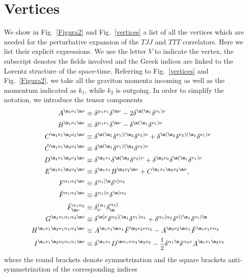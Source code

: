 \documentclass[a4paper,11pt,openright,twoside]{book}
\let\a=\alpha   \let\b=\beta   \let\g=\gamma   \let\d=\delta
\let\n=\nu      \let\x=\xi     \let\p=\pi      \let\r=\rho
\newcommand{\sdfrac}[2]{\mbox{\small$\displaystyle\frac{#1}{#2}$}}
\newcommand{\figref}[1]{Fig.~\ref{#1}}			%
\numberwithin{equation}{section}
\begin{document}
{{\chapter{Vertices}\label{Appendix1}
We show in \figref{Figura2} and \figref{vertices} a list of all the vertices which are needed for the  perturbative expansion of the $TJJ$ and $TTT$ correlators. Here we list their explicit expressions. We use the letter $V$ to indicate the vertex, the subscript denotes the fields involved and the Greek indices are linked to the Lorentz structure of the space-time. Referring to \figref{vertices} and \figref{Figura2}, we take all the graviton momenta incoming as well as the momentum indicated as $k_1$, while $k_2$ is outgoing. In order to simplify the notation, we introduce the tensor components
\begin{align}
	A^{\m_1\n_1\m\n}&\equiv\d^{\mu_1\nu_1}\d^{\m\n}-2\d^{\m(\m_1}\d^{\n_1)\n}\\
	B^{\m_1\n_1\m\n}&\equiv\d^{\mu_1\nu_1}\d^{\m\n}-\d^{\m(\m_1}\d^{\n_1)\n}\\
	C^{\m_1\n_1\m_2\n_2\m\n}&\equiv\d^{\m(\m_1}\d^{\n_1)(\m_2}\d^{\n_2)\n}+\d^{\m(\m_2}\d^{\n_2)(\m_1}\d^{\n_1)\n}\\
	\tilde{C}^{\m_1\n_1\m_2\n_2\m\n}&\equiv\d^{\m(\m_1}\d^{\n_1)(\m_2}\d^{\n_2)\n}\\
	D^{\m_1\n_1\m_2\n_2\m\n}&\equiv\d^{\m_1\n_1}\d^{\m(\m_2}\d^{\n_2)\n}+\d^{\m_2\n_2}\d^{\m(\m_1}\d^{\n_1)\n}\\
	E^{\m_1\n_1\m_2\n_2\m\n}&\equiv\d^{\m_1\n_1}B^{\m_2\n_2\m\n}+C^{\m_1\n_1\m_2\n_2\m\n},\\
	F^{\a_1\a_2\m\n}&\equiv\d^{\a_1[\m}\d^{\n]\a_2}\\
	\tilde{F}^{\a_1\a_2\m\n}&\equiv\d^{\a_1(\n}\d^{\m)\a_2}\\
	\tilde{F}^{\a_1\a_2}_{\m\n}&\equiv\d^{(\a_1}_{\n}\d_{\m}^{\a_2)}\\
	G^{\m_1\n_1\a_1\a_2\m\n}&\equiv\d^{\m[\n}\d^{\a_2](\m_1}\d^{\n_1)\a_1}+\d^{\a_1[\a_2}\d^{\n](\m_1}\d^{\n_1)\m}\\
	H^{\m_1\n_1\m_2\n_1\a_1\a_2\m\n}&\equiv A^{\m_1\n_1\m\a_1}\tilde{F}^{\m_2\n_2\n\a_2}-A^{\m_2\n_2\m\a_1}\tilde{F}^{\m_1\n_1\n\a_2}\\
	I^{\m_1\n_1\m_2\n_2\a_1\a_1\m\n}&\equiv\d^{\m_1\n_1}D^{\m\a_1\n\a_2\m_2\n_2}-\sdfrac{1}{2}\d^{\a_1\m}\d^{\a_2\n}A^{\m_1\n_1\m_2\n_2}
\end{align}
where the round brackets denote symmetrization and the square brackets anti-symmetrization of the corresponding indices
}}
\end{document}
